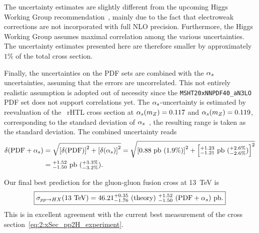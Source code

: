 The uncertainty estimates are slightly different from the upcoming Higgs Working Group recommendation~\cite{Cappati:2024}, mainly due to the fact that electroweak corrections are not incorporated with full \acs{NLO} precision. Furthermore, the Higgs Working Group assumes maximal correlation among the various uncertainties. The uncertainty estimates presented here are therefore smaller by approximately $1\%$ of the total cross section.

Finally, the uncertainties on the \acs{PDF} sets are combined with the $\alpha_s$ uncertainties, assuming that the errors are uncorrelated. This not entirely realistic assumption is adopted out of necessity since the \texttt{MSHT20xNNPDF40\_aN3LO} \acs{PDF} set does not support correlations yet. The $\alpha_s$-uncertainty is estimated by reevaluation of the \NNNLO\ \acs{rHTL} cross section at $\alpha_s (m_Z) = 0.117$ and $\alpha_s (m_Z) = 0.119$, corresponding to the standard deviation of $\alpha_s$~\cite{ParticleDataGroup:2022pth}, the resulting range is taken as the standard deviation. The combined uncertainty reads
\begin{equation}
\begin{split}
\delta (\text{PDF} + \alpha_s) &= \sqrt{\left[\delta (\text{PDF}) \right]^2 + \left[\delta (\alpha_s)\right]^2} = \sqrt{\left[0.88\ \text{pb}\ (1.9\%) \right]^2 + \left[{}^{+1.23}_{-1.21} \ \text{pb}\ ({}^{+2.6\%}_{-2.6\%}) \right]^2} \\
&= {}^{+1.52}_{-1.50}\ \text{pb} \ ({}^{+3.3\%}_{-3.2\%}).
\end{split}
\end{equation}

Our final best prediction for the gluon-gluon fusion cross at 13~TeV is
\begin{equation}
\boxed{\sigma_{pp \rightarrow HX} (13 \ \mathrm{TeV}) =  46.21^{+0.35}_{-1.76}\ (\text{theory})\ {}^{+1.52}_{-1.50}\ (\text{PDF} + \alpha_s) \ \text{pb}. }
\end{equation}
This is in excellent agreement with the current best measurement of the cross section~\eqref{eq:2:xSec_pp2H_experiment}.



